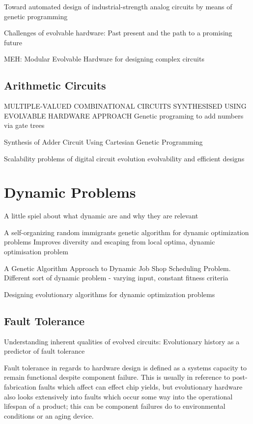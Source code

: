 \todo Toward automated design of industrial-strength analog circuits by means of genetic programming

\todo Challenges of evolvable hardware: Past present and the path to a promising future \cite{Haddow2011}

\todo MEH: Modular Evolvable Hardware for designing complex circuits

\subsection{Arithmetic Circuits}

\todo MULTIPLE-VALUED COMBINATIONAL CIRCUITS SYNTHESISED USING EVOLVABLE HARDWARE APPROACH
Genetic programing to add numbers via gate trees

\todo Synthesis of Adder Circuit Using Cartesian Genetic Programming

\todo Scalability problems of digital circuit evolution evolvability and efficient designs

\section{Dynamic Problems}
\todo A little spiel about what dynamic are and why they are relevant

\todo A self-organizing random immigrants genetic algorithm for dynamic optimization problems \cite{1703646}
Improves diversity and escaping from local optima, dynamic optimisation problem

\todo A Genetic Algorithm Approach to Dynamic Job Shop Scheduling Problem. \cite{Lin1997AGA}
Different sort of dynamic problem - varying input, constant fitness criteria

\todo Designing evolutionary algorithms for dynamic optimization problems\cite{Branke2003}

\subsection{Fault Tolerance}
\todo Understanding inherent qualities of evolved circuits: Evolutionary history as a predictor of fault tolerance

Fault tolerance in regards to hardware design is defined as a systems capacity to
remain functional despite component failure. This is usually in reference to
post-fabrication faults which affect can effect chip yields, but evolutionary
hardware also looks extensively into faults which occur some way into the
operational lifespan of a product; this can be component failures do to environmental
conditions or an aging device.

